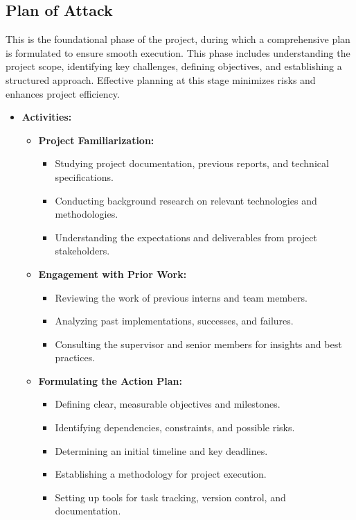 \documentclass{article}
\begin{document}
\subsection{Plan of Attack}
This is the foundational phase of the project, during which a comprehensive plan is formulated to ensure smooth execution.
This phase includes understanding the project scope, identifying key challenges, defining objectives, and establishing a structured approach.
Effective planning at this stage minimizes risks and enhances project efficiency.

\begin{itemize}[leftmargin=*, label={}]
    \item \textbf{Activities:}
    \begin{itemize}
        \item \textbf{Project Familiarization:}
        \begin{itemize}
            \item Studying project documentation, previous reports, and technical specifications.
            \item Conducting background research on relevant technologies and methodologies.
            \item Understanding the expectations and deliverables from project stakeholders.
        \end{itemize}
        \item \textbf{Engagement with Prior Work:}
        \begin{itemize}
            \item Reviewing the work of previous interns and team members.
            \item Analyzing past implementations, successes, and failures.
            \item Consulting the supervisor and senior members for insights and best practices.
        \end{itemize}
        \item \textbf{Formulating the Action Plan:}
        \begin{itemize}
            \item Defining clear, measurable objectives and milestones.
            \item Identifying dependencies, constraints, and possible risks.
            \item Determining an initial timeline and key deadlines.
            \item Establishing a methodology for project execution.
            \item Setting up tools for task tracking, version control, and documentation.

\end{itemize}
\end{itemize}
\end{itemize}
\end{document}
